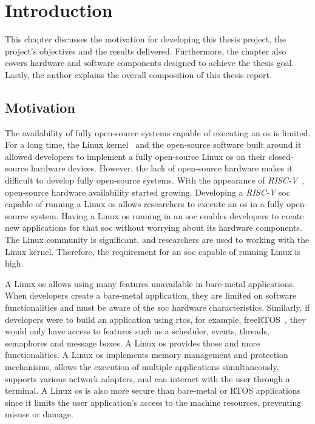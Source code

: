 \chapter{Introduction}
\label{chapter:introduction}
This chapter discusses the motivation for developing this thesis project, the project's objectives and the results delivered. Furthermore, the chapter also covers hardware and software components designed to achieve the thesis goal. Lastly, the author explains the overall composition of this thesis report.

\section{Motivation}
\label{section:motivation}
The availability of fully open-source systems capable of executing an \acrfull{os} is limited. For a long time, the Linux kernel~\cite{torvalds1997linux} and the open-source software built around it allowed developers to implement a fully open-source Linux \acrshort{os} on their closed-source hardware devices. However, the lack of open-source hardware makes it difficult to develop fully open-source systems. With the appearance of \textit{RISC-V}~\cite{asanovic2014instruction}, open-source hardware availability started growing. Developing a \textit{RISC-V} \acrfull{soc} capable of running a Linux \acrshort{os} allows researchers to execute an \acrshort{os} in a fully open-source system. Having a Linux \acrshort{os} running in an \acrshort{soc} enables developers to create new applications for that \acrshort{soc} without worrying about its hardware components. The Linux community is significant, and researchers are used to working with the Linux kernel. Therefore, the requirement for an \acrshort{soc} capable of running Linux is high.

A Linux \acrshort{os} allows using many features unavailable in bare-metal applications. When developers create a bare-metal application, they are limited on software functionalities and must be aware of the \acrshort{soc} hardware characteristics. Similarly, if developers were to build an application using \acrfull{rtos}, for example, freeRTOS~\cite{barry2008freertos}, they would only have access to features such as a scheduler, events, threads, semaphores and message boxes. A Linux \acrshort{os} provides those and more functionalities. A Linux \acrshort{os} implements memory management and protection mechanisms, allows the execution of multiple applications simultaneously, supports various network adapters, and can interact with the user through a terminal. A Linux \acrshort{os} is also more secure than bare-metal or RTOS applications since it limits the user application's access to the machine resources, preventing misuse or damage.

